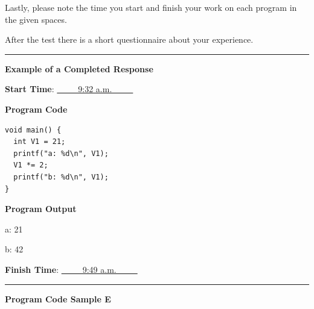 \documentclass[12pt, a4paper, oneside]{article}
\begin{document}
Lastly, please note the time you start and finish your work on each program in the given spaces.

After the test there is a short questionnaire about your experience.

\begin{center}\rule{0.8\linewidth}{2pt}\end{center}


\textbf{Example of a Completed Response}

\vspace{10pt}

\textbf{Start Time}: \underline{~~~~~9:32 a.m.~~~~~}

\vspace{10pt}

\textbf{Program Code}

\begin{lstlisting}
void main() {
  int V1 = 21;
  printf("a: %d\n", V1);
  V1 *= 2;
  printf("b: %d\n", V1);
}
\end{lstlisting}

\textbf{Program Output}

a: 21

b: 42

\textbf{Finish Time}: \underline{~~~~~9:49 a.m.~~~~~}

\begin{center}\rule{0.8\linewidth}{2pt}\end{center}

  \pagebreak


\textbf{Program Code Sample E}

\vspace{20pt}


\end{document}
